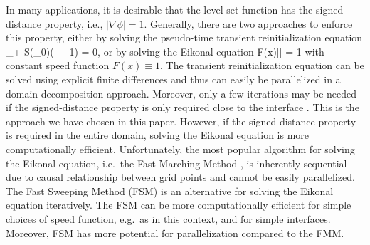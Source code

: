 In many applications, it is desirable that the level-set function has the signed-distance property, i.e., $|\nabla \phi| = 1$. Generally, there are two approaches to enforce this property, either by solving the pseudo-time transient reinitialization equation \cite{Sussman;Smereka;Osher:94:A-Level-Set-Approach, Osher;Fedkiw:01:Level-Set-Methods:-A}
\ben
\phi_\tau + S(\phi_0)\left(|\nabla \phi| - 1\right) = 0,
\een
or by solving the Eikonal equation
\ben
F(x)|\nabla\phi| = 1
\een 
with constant speed function $F(x) \equiv 1$. The transient reinitialization equation can be solved using explicit finite differences and thus can easily be parallelized in a domain decomposition approach. Moreover, only a few iterations may be needed if the signed-distance property is only required close to the interface \cite{Min;Gibou:07:A-second-order-accur}. This is the approach we have chosen in this paper. However, if the signed-distance property is required in the entire domain, solving the Eikonal equation is more computationally efficient. Unfortunately, the most popular algorithm for solving the Eikonal equation, i.e.\ the Fast Marching Method \cite{Sethian:96:A-Fast-Marching-Leve,Sethian:99:Level-set-methods-an}, is inherently sequential due to causal relationship between grid points and cannot be easily parallelized.
The Fast Sweeping Method (FSM) \cite{Zhao:05:A-fast-sweeping-meth} is an
alternative for solving the Eikonal equation iteratively.
The FSM can be more computationally efficient for simple choices of speed
function, e.g.\ as in this context, and for simple interfaces.
Moreover, FSM has more potential for parallelization compared to the FMM.


